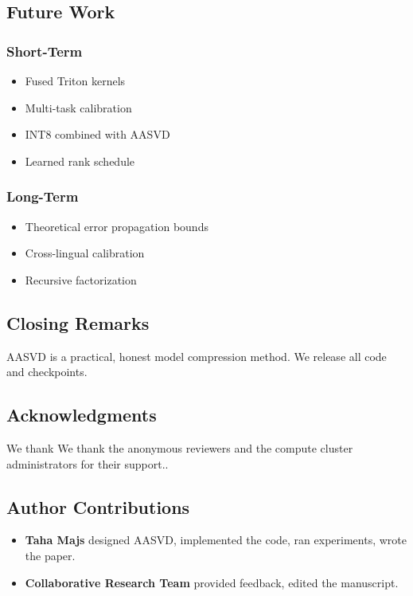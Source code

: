 \subsection{Future Work}

\subsubsection{Short-Term}
\begin{itemize}
\item Fused Triton kernels
\item Multi-task calibration
\item INT8 combined with AASVD
\item Learned rank schedule

\end{itemize}
\subsubsection{Long-Term}
\begin{itemize}
\item Theoretical error propagation bounds
\item Cross-lingual calibration
\item Recursive factorization

\end{itemize}
\subsection{Closing Remarks}

AASVD is a practical, honest model compression method. We release all code 
and checkpoints.

\subsection{Acknowledgments}

We thank We thank the anonymous reviewers and the compute cluster administrators for their support..

\subsection{Author Contributions}

\begin{itemize}
\item \textbf{Taha Majs} designed AASVD, implemented the code, ran experiments,
  wrote the paper.
\item \textbf{Collaborative Research Team} provided feedback, edited the manuscript.

\end{itemize}
